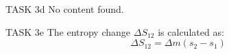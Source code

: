 TASK 3d  
No content found.

TASK 3e  
The entropy change \( \Delta S_{12} \) is calculated as:  
\[
\Delta S_{12} = \Delta m (s_2 - s_1)
\]
